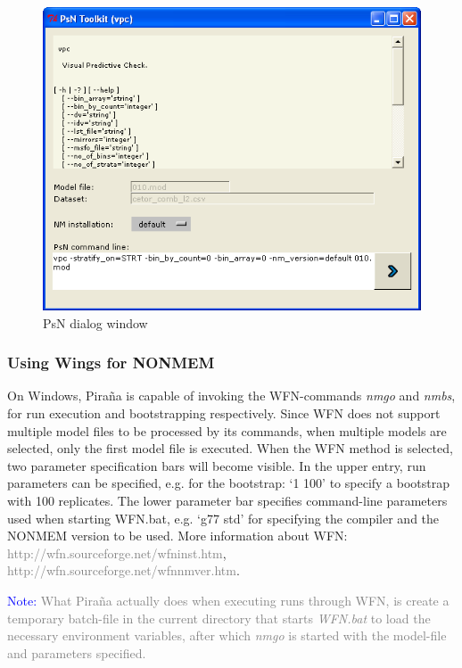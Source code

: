 \documentclass[a4,11pt]{report} \usepackage[pdftex]{graphicx}
\begin{document}
{\begin{figure}[hbt] \centering
    \includegraphics[scale=0.4]{images/psn_dialog.png}
    \caption{PsN dialog window}
\end{figure}

\subsubsection*{Using Wings for NONMEM} On Windows, Pira\~na is
capable of invoking the WFN-commands \emph{nmgo} and \emph{nmbs}, for
run execution and bootstrapping respectively. Since
WFN does not support multiple model files to be processed by its
commands, when multiple models are selected, only the first model file
is executed. When the WFN method is selected, two parameter
specification bars will become visible. In the upper entry, run
parameters can be specified, e.g. for the bootstrap: `1 100' to
specify a bootstrap with 100 replicates. The lower parameter bar
specifies command-line parameters used when starting WFN.bat,
e.g. `g77 std' for specifying the compiler and the NONMEM version to
be used. More information about WFN:
\textcolor{Grey}{http://wfn.sourceforge.net/wfninst.htm},
\textcolor{Grey}{http://wfn.sourceforge.net/wfnnmver.htm}.

\vspace{10pt}
\noindent\scriptsize{\textcolor{Blue}{Note:} \textcolor{Grey} {What Pira\~na actually does when executing runs through WFN, is create a temporary batch-file in the current directory that starts \emph{WFN.bat} to load the necessary environment variables, after which \emph{nmgo} is started with the model-file and parameters specified.}
  \normalsize

}}
\end{document}
